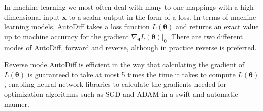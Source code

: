 In machine learning we most often deal with many-to-one mappings with a
high-dimensional input $\bm{x}$ to a scalar output in the form of a loss. In
terms of machine learning models, AutoDiff takes a loss function
$L(\bm{\theta})$ and returns an exact value up to machine accuracy for the
gradient $\nabla_{\bm{\theta}} L(\bm{\theta}) \vert_{\bm{\theta}}$. There are
two different modes of AutoDiff, forward and reverse, although in practice
reverse is preferred.

Reverse mode AutoDiff is efficient in the way that calculating the gradient of
$L(\bm{\theta})$ is guaranteed to take at most 5 times the time it takes to
compute $L(\bm{\theta})$ \cite{Barber15deeplearning:}, enabling neural network
libraries to calculate the gradients needed for optimization algorithms such as
SGD and ADAM in a swift and automatic manner.
